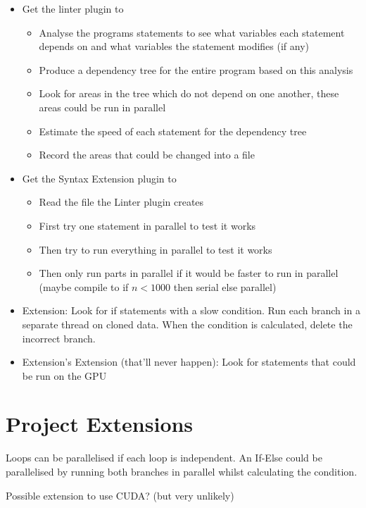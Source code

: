 \documentclass[12pt, a4paper]{article}
\begin{document}
\begin{itemize}
	\item Get the linter plugin to
	\begin{itemize}
		\item Analyse the programs statements to see what variables each statement depends on and what variables the statement modifies (if any)
		\item Produce a dependency tree for the entire program based on this analysis
		\item Look for areas in the tree which do not depend on one another, these areas could be run in parallel
		\item Estimate the speed of each statement for the dependency tree
		\item Record the areas that could be changed into a file
	\end{itemize}
	\item Get the Syntax Extension plugin to
	\begin{itemize}
		\item Read the file the Linter plugin creates
		\item First try one statement in parallel to test it works
		\item Then try to run everything in parallel to test it works
		\item Then only run parts in parallel if it would be faster to run in parallel (maybe compile to if $n < 1000$ then serial else parallel)
	\end{itemize}
	\item Extension: Look for if statements with a slow condition. Run each branch in a separate thread on cloned data. When the condition is calculated, delete the incorrect branch.
	\item Extension's Extension (that'll never happen): Look for statements that could be run on the GPU

\end{itemize}

\section{Project Extensions}
Loops can be parallelised if each loop is independent. An If-Else could be parallelised by running both branches in parallel whilst calculating the condition.

Possible extension to use CUDA? (but very unlikely)
\end{document}
